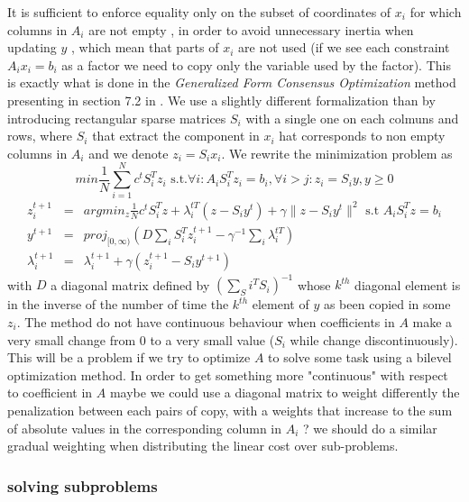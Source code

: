 \documentclass[11pt]{article}
\begin{document}
It is sufficient to enforce equality only on the subset of coordinates of $x_i$ for which columns in $A_i$ are not empty , in order to avoid unnecessary inertia when updating $y$ , which mean that parts of $x_i$ are not used (if we see each constraint $A_i x_i= b_i$ as a factor we need to copy only the variable used by the factor). This is exactly what is done in the \textit{Generalized Form Consensus Optimization} method presenting in section 7.2 in \cite{Boyd2010}. 
We use a slightly different formalization than  \cite{Boyd2010} by introducing rectangular sparse matrices $S_i$ with a single one on each colmuns and rows, where $S_i$ that extract the component in $x_i$ hat corresponds to non empty columns in $A_i$  and we denote $z_i=S_ix_i$.
We rewrite the minimization problem as
\begin{equation}
min \frac{1}{N}\sum_{i=1}^N c^t S_i^T z_i \text{ s.t.} \forall i : A_iS_i^T z_i = b_i , \forall i>j: z_i=S_iy, y\geq 0
\end{equation}
\begin{eqnarray}
z_i^{t+1}&=&argmin_z  \frac{1}{N}c^tS_i^T z +\lambda_i^{tT} (z-S_iy^t)+\gamma\|z-S_iy^t\|^2 \text{ s.t } A_iS_i^Tz=b_i\\
y^{t+1}&=&proj_{[0,\infty)} (D\sum_i S_i^Tz_i^{t+1}-\gamma^{-1} \sum_i \lambda_i^{tT} )\\
\lambda_i^{t+1}&=&\lambda_i^{t+1}+\gamma(z_i^{t+1}-S_iy^{t+1})
\label{eqn:Generalized_Form_Consensus_Optimization}
\end{eqnarray}
with $D$ a diagonal matrix defined by $(\sum_Si^TS_i)^{-1}$ whose $k^{th}$ diagonal element is in the inverse of the number of time the $k^{th}$ element of $y$ as been copied in some $z_i$. The method do not have continuous behaviour when coefficients in $A$ make a very small change from 0 to a very small value ($S_i$ while change discontinuously). This will be a problem if we try to optimize $A$ to solve some task using a bilevel optimization method. In order to get something more "continuous" with respect to coefficient in $A$ maybe we could use a diagonal matrix to weight differently the penalization between  each pairs of copy, with a weights that increase to the sum of absolute values in the corresponding column in $A_i$ ?  we should do a similar gradual weighting when distributing the linear cost over sub-problems.


\subsubsection{solving subproblems}
\end{document}
